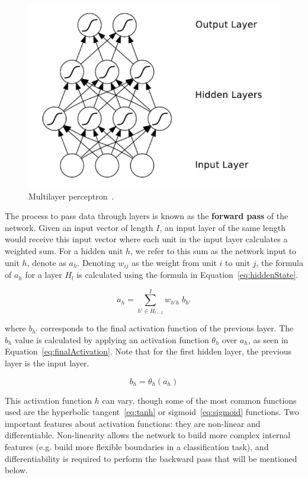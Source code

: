 \begin{figure}[!h]
    \centering
    \includegraphics[scale=.45]{imagenes/appendices/appendix_a/mlpModel.PNG}
    \caption{Multilayer perceptron~\cite{seqlab:Graves2012-385}.}
    \label{fig:multilayerPerceptron}
\end{figure}

The process to pass data through layers is known as the \textbf{forward pass} of the network. 
Given an input vector of length $I$, an input layer of the same length would receive this 
input vector where each unit in the input layer calculates a weighted sum. For a hidden unit 
$h$, we refer to this sum as the network input to unit $h$, denote as $a_h$. Denoting $w_{ij}$ 
as the weight from unit $i$ to unit $j$, the formula of $a_h$ for a layer $H_{l}$ is calculated 
using the formula in Equation~\ref{eq:hiddenState}.

\begin{equation} \label{eq:hiddenState}
    a_h = \sum_{h' \in H_{l-1}}^I w_{h'h} \; b_{h'}
\end{equation}

where $b_{h'}$ corresponds to the final activation function of the previous layer. The $b_h$ 
value is calculated by applying an activation function $\theta_h$ over $a_h$, as seen in 
Equation~\ref{eq:finalActivation}. Note that for the first hidden layer, the previous layer 
is the input layer.

\begin{equation} \label{eq:finalActivation}
    b_h = \theta_h(a_h)
\end{equation}

This activation function $h$ can vary, though some of the most common functions used are the 
hyperbolic tangent~\ref{eq:tanh} or sigmoid~\ref{eq:sigmoid} functions. Two important features 
about activation functions: they are non-linear and differentiable. Non-linearity allows the 
network to build more complex internal features (e.g. build more flexible boundaries in a 
classification task), and differentiability is required to perform the backward pass that 
will be mentioned below.

